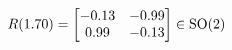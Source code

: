 \documentclass[preview]{standalone}
\begin{document}
\begin{align*}
\special{dvisvgm:raw <g id='unique000'>}R(1.70) = \begin{bmatrix} -0.13 & -0.99 \\ 0.99 & -0.13 \end{bmatrix} \in \text{SO}(2)\special{dvisvgm:raw </g>}
\end{align*}
\end{document}
